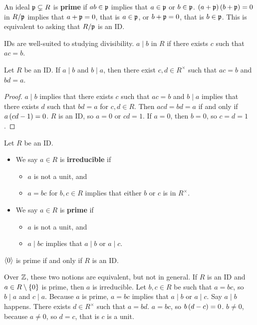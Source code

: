 \begin{remark*}
An ideal $ \mathfrak{p} \subsetneq R $ is \textbf{prime} if $ ab \in \mathfrak{p} $ implies that $ a \in \mathfrak{p} $ or $ b \in \mathfrak{p} $. $ \br{a + \pp}\br{b + \pp} = 0 $ in $ R / \mathfrak{p} $ implies that $ a + \mathfrak{p} = 0 $, that is $ a \in \mathfrak{p} $, or $ b + \mathfrak{p} = 0 $, that is $ b \in \mathfrak{p} $. This is equivalent to asking that $ R / \mathfrak{p} $ is an ID.
\end{remark*}

IDs are well-suited to studying divisibility. $ a \mid b $ in $ R $ if there exists $ c $ such that $ ac = b $.

\begin{lemma}
Let $ R $ be an ID. If $ a \mid b $ and $ b \mid a $, then there exist $ c, d \in R^\times $ such that $ ac = b $ and $ bd = a $.
\end{lemma}

\begin{proof}
$ a \mid b $ implies that there exists $ c $ such that $ ac = b $ and $ b \mid a $ implies that there exists $ d $ such that $ bd = a $ for $ c, d \in R $. Then $ acd = bd = a $ if and only if $ a\br{cd - 1} = 0 $. $ R $ is an ID, so $ a = 0 $ or $ cd = 1 $. If $ a = 0 $, then $ b = 0 $, so $ c = d = 1 $.
\end{proof}

\begin{definition}
Let $ R $ be an ID.
\begin{itemize}
\item We say $ a \in R $ is \textbf{irreducible} if
\begin{itemize}
\item $ a $ is not a unit, and
\item $ a = bc $ for $ b, c \in R $ implies that either $ b $ or $ c $ is in $ R^\times $.
\end{itemize}
\item We say $ a \in R $ is \textbf{prime} if
\begin{itemize}
\item $ a $ is not a unit, and
\item $ a \mid bc $ implies that $ a \mid b $ or $ a \mid c $.
\end{itemize}
\end{itemize}
\end{definition}

$ \left\langle 0 \right\rangle $ is prime if and only if $ R $ is an ID.

\begin{remark*}
Over $ \mathbb{Z} $, these two notions are equivalent, but not in general. If $ R $ is an ID and $ a \in R \setminus \cbr{0} $ is prime, then $ a $ is irreducible. Let $ b, c \in R $ be such that $ a = bc $, so $ b \mid a $ and $ c \mid a $. Because $ a $ is prime, $ a = bc $ implies that $ a \mid b $ or $ a \mid c $. Say $ a \mid b $ happens. There exists $ d \in R^\times $ such that $ a = bd $. $ a = bc $, so $ b\br{d - c} = 0 $. $ b \ne 0 $, because $ a \ne 0 $, so $ d = c $, that is $ c $ is a unit.
\end{remark*}

